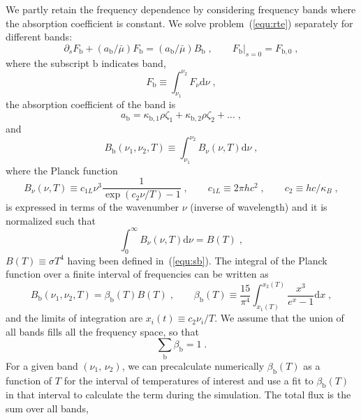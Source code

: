 We partly retain the frequency dependence by considering frequency bands where the absorption coefficient is constant. We solve problem~(\ref{equ:rte}) separately for different bands:
\begin{equation}
    \partial_s F_\mathrm{b}+(a_\mathrm{b}/\bar{\mu}) F_\mathrm{b} = (a_\mathrm{b}/\bar{\mu}) B_\mathrm{b}\;,\qquad F_\mathrm{b}|_{s=0}=F_{\mathrm{b},0} \;,
\end{equation}
where the subscript $\mathrm{b}$ indicates band, 
\begin{equation}
    F_\mathrm{b}\equiv\int_{\nu_1}^{\nu_2}F_\nu\mathrm{d} \nu\;,
\end{equation}
the absorption coefficient of the band is
\begin{equation}
    a_\mathrm{b} = \kappa_{\mathrm{b},1} \rho \zeta_1 + \kappa_{\mathrm{b},2} \rho \zeta_2 + \ldots \;,
\end{equation}
and 
\begin{equation}
    B_\mathrm{b}(\nu_1,\nu_2,T)\equiv\int_{\nu_1}^{\nu_2}B_\nu(\nu,T)\mathrm{d} \nu\;,
\end{equation}
where the Planck function 
\begin{equation}
    B_\nu(\nu,T)\equiv c_{1L}\nu^3\frac{1}{\exp(c_2\nu/T)-1}\;,\qquad c_{1L}\equiv 2\pi hc^2\;,\qquad c_2\equiv hc/\kappa_B \;,
\end{equation}
is expressed in terms of the wavenumber $\nu$ (inverse of wavelength) and it is normalized such that
\begin{equation}
    \int_0^\infty B_\nu(\nu,T)\mathrm{d}\nu = B(T)\;,
\end{equation}
$B(T)\equiv\sigma T^4$ having been defined in~(\ref{equ:sb}). The integral of the Planck function over a finite interval of frequencies can be written as
\begin{equation}
    B_\mathrm{b}(\nu_1,\nu_2,T)=\beta_\mathrm{b}(T)B(T) \;,\qquad
    \beta_\mathrm{b}(T)\equiv\frac{15}{\pi^4}\int_{x_1(T)}^{x_2(T)}\frac{x^3}{e^x-1}\mathrm{d}x \;,
\end{equation}
and the limits of integration are $x_i(t)\equiv c_2\nu_i/T$. We assume that the union of all bands fills all the frequency space, so that
\begin{equation}
    \sum_\mathrm{b} \beta_\mathrm{b} =1\;.
\end{equation}
For a given band $(\nu_1,\,\nu_2)$, we can precalculate numerically $\beta_\mathrm{b}(T)$ as a function of $T$ for the interval of temperatures of interest and use a fit to $\beta_\mathrm{b}(T)$ in that interval to calculate the term during the simulation. The total flux is the sum over all bands,
